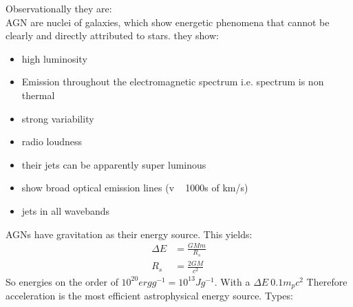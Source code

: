 \documentclass[11pt,a4paper]{article}
\begin{document}
Observationally they are: \\
AGN are nuclei of galaxies, which show energetic phenomena that cannot be clearly and directly attributed to stars.
they show: 
\begin{itemize}
    \item high luminosity 
    \item Emission throughout the electromagnetic spectrum i.e. spectrum is non thermal
    \item strong variability
    \item radio loudness
    \item their jets can be apparently super luminous
    \item show broad optical emission lines (v ~ 1000s of km/s)
    \item jets in all wavebands
\end{itemize}
AGNs have gravitation as their energy source. 
This yields:
\begin{align*}
    \Delta E &= \frac {GMm}{R_s}  \\
    R_s &= \frac {2 GM} {c^2}
\end{align*}
So energies on the order of $10^{20} ergg^{-1} = 10^{13} J g^{-1}$. 
With a $\Delta E ~ 0.1 m_p c^2$
Therefore acceleration is the most efficient astrophysical energy source.
Types:
\end{document}
